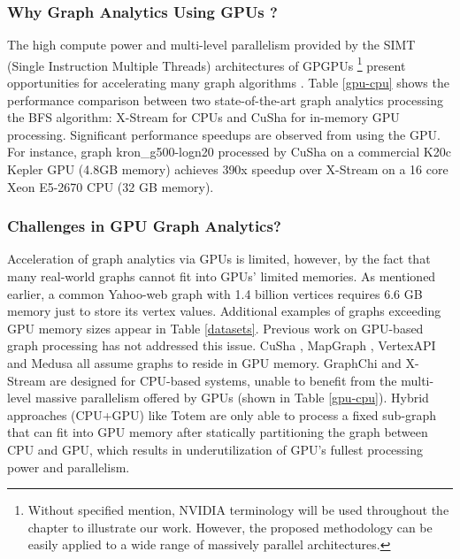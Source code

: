 \subsubsection{Why Graph Analytics Using GPUs ?}
The high compute power and multi-level parallelism provided by the SIMT (Single Instruction Multiple Threads) architectures of GPGPUs \footnote{\scriptsize Without specified mention, NVIDIA terminology will be used throughout the chapter
to illustrate our work. However, the proposed methodology can be easily applied to a wide range of massively
parallel architectures.} present opportunities for 
accelerating many graph algorithms \cite{medusa, cusha,vertexapi,mapgraph}. Table \ref{gpu-cpu} shows the performance comparison between two state-of-the-art graph analytics 
processing the BFS algorithm: X-Stream \cite{xstream} for CPUs and CuSha \cite{cusha} for in-memory GPU processing. Significant performance speedups are
observed from using the GPU. For instance,  graph kron\_g500-logn20 \cite{kron20} processed by CuSha on a commercial K20c Kepler GPU 
(4.8GB memory) achieves 390x speedup over X-Stream on a 16 core Xeon E5-2670 CPU (32 GB memory).


\subsubsection{Challenges in GPU Graph Analytics?}
Acceleration of graph analytics via GPUs is limited, however, by the fact that many real-world graphs cannot fit into 
GPUs' limited memories. As mentioned earlier, a common Yahoo-web graph \cite{yahoo} with 1.4 billion vertices requires 6.6 GB memory 
just to store its vertex values. Additional examples of graphs exceeding GPU memory sizes appear in Table \ref{datasets}.
Previous work on GPU-based graph processing has not addressed this issue. CuSha \cite{cusha}, MapGraph \cite{mapgraph}, VertexAPI \cite{vertexapi} and Medusa \cite{medusa} all assume graphs to reside in GPU memory. GraphChi \cite{chi} and X-Stream \cite{xstream} are designed for CPU-based systems, 
unable to benefit from the multi-level massive parallelism offered by GPUs (shown in Table \ref{gpu-cpu}). Hybrid approaches (CPU+GPU) like Totem \cite{totem} are only able to process a fixed sub-graph that can fit into GPU memory after statically partitioning the graph between CPU and GPU, which results in underutilization of GPU's fullest processing power and parallelism. 
 






